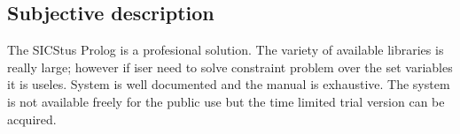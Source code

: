 \subsection{Subjective description}
The SICStus Prolog is a profesional solution. The variety of available libraries 
is really large; however if iser need to solve constraint problem over the set variables 
it is useles. System is well documented and the manual is exhaustive. The system
is not available freely for the public use but the time limited trial version can
be acquired.